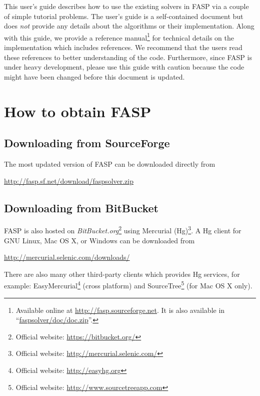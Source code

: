 \documentclass[11pt]{memoir}
\begin{document}
This user's guide describes how to use the existing solvers in FASP
via a couple of simple tutorial problems. The user's guide is a
self-contained document but does \emph{not} provide any details about
the algorithms or their implementation. Along with this guide, we provide a
reference manual\footnote{Available online at
  \url{http://fasp.sourceforge.net}. It is also available in
  ``\url{faspsolver/doc/doc.zip}''.} for technical details on the
implementation which includes references. We recommend that the users
read these references to better
understanding of the code. Furthermore, since FASP is under heavy
development, please use this guide with caution because the code might
have been changed before this document is updated.


\section{How to obtain FASP}\label{sec:install}

\subsection{Downloading from SourceForge}

The most updated version of FASP can be downloaded directly from
%
\begin{center}
\url{http://fasp.sf.net/download/faspsolver.zip}
\end{center}
%

\subsection{Downloading from BitBucket}

FASP is also hosted on
\emph{BitBucket.org}\footnote{Official website:
  \url{https://bitbucket.org/}} using Mercurial (Hg)\footnote{Official
  website: \url{http://mercurial.selenic.com/}}. A Hg client for GNU
Linux, Mac OS X, or Windows can be downloaded from
\begin{center}
  \url{http://mercurial.selenic.com/downloads/}
\end{center}
%
There are also many other third-party clients which provides Hg services, for example: EasyMercurial\footnote{Official website: \url{http://easyhg.org}} (cross platform) and SourceTree\footnote{Official website: \url{http://www.sourcetreeapp.com}} (for Mac OS X only).
\end{document}

